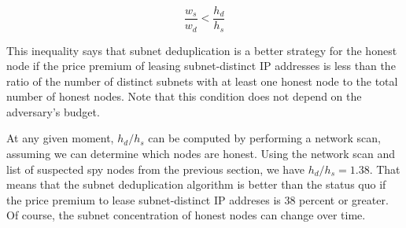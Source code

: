 \documentclass[usletter,11pt,english,openany]{article}
\begin{document}
\begin{equation}
\dfrac{w_{s}}{w_{d}}<\dfrac{h_{d}}{h_{s}}
\end{equation}

This inequality says that subnet deduplication is a better strategy
for the honest node if the price premium of leasing subnet-distinct
IP addresses is less than the ratio of the number of distinct subnets
with at least one honest node to the total number of honest nodes.
Note that this condition does not depend on the adversary's budget.

At any given moment, $h_{d}/h_{s}$ can be computed by performing
a network scan, assuming we can determine which nodes are honest.
Using the network scan and list of suspected spy nodes from the previous
section, we have $h_{d}/h_{s}=1.38$. That means that the subnet deduplication
algorithm is better than the status quo if the price premium to lease
subnet-distinct IP addreses is 38 percent or greater. Of course, the
subnet concentration of honest nodes can change over time.

\begin{singlespace}

\end{singlespace}
\end{document}
